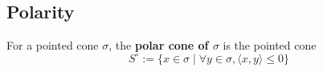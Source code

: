 \subsection{Polarity}

\begin{definition}
  \label{polar-cone}
  For a pointed cone \( \sigma \), the {\bf polar cone of \( \sigma \)} is
  the pointed cone
  \[
      S^\circ := \{x \in \sigma \mid \forall y \in \sigma, \langle x, y \rangle
      \leq 0 \}
  \]
\end{definition}




